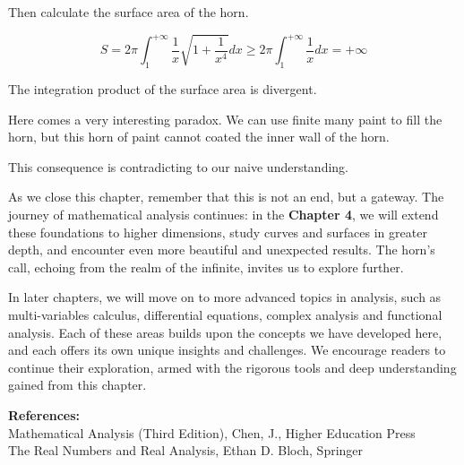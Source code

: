 Then calculate the surface area of the horn.

\[
S = 2\pi \int_{1}^{+\infty} \frac{1}{x} \sqrt{1+\frac{1}{x^4}} dx \geq 2\pi \int_{1}^{+\infty} \frac{1}{x} dx = +\infty
\]

The integration product of the surface area is divergent.

Here comes a very interesting paradox. We can use finite many paint to fill the horn, but this horn of paint cannot coated the inner wall of the horn.

This consequence is contradicting to our naive understanding.

As we close this chapter, remember that this is not an end, but a gateway. The journey of mathematical analysis continues: in the \textbf{Chapter 4}, we will extend these foundations to higher dimensions, study curves and surfaces in greater depth, and encounter even more beautiful and unexpected results. The horn's call, echoing from the realm of the infinite, invites us to explore further.

In later chapters, we will move on to more advanced topics in analysis, such as multi-variables calculus, differential equations, complex analysis and functional analysis. Each of these areas builds upon the concepts we have developed here, and each offers its own unique insights and challenges. We encourage readers to continue their exploration, armed with the rigorous tools and deep understanding gained from this chapter.


\vspace{1cm}
\noindent
\textbf{References:} \\
Mathematical Analysis (Third Edition), Chen, J., Higher Education Press \\
The Real Numbers and Real Analysis, Ethan D. Bloch, Springer

\cleardoublepage